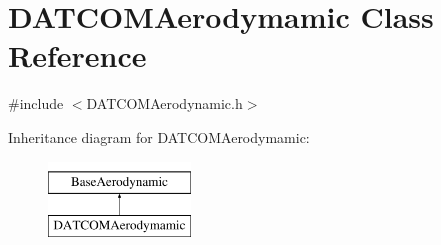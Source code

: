\hypertarget{class_d_a_t_c_o_m_aerodymamic}{}\section{D\+A\+T\+C\+O\+M\+Aerodymamic Class Reference}
\label{class_d_a_t_c_o_m_aerodymamic}


{\ttfamily \#include $<$D\+A\+T\+C\+O\+M\+Aerodynamic.\+h$>$}

Inheritance diagram for D\+A\+T\+C\+O\+M\+Aerodymamic\+:\begin{figure}[H]
\begin{center}
\leavevmode
\includegraphics[height=2.000000cm]{class_d_a_t_c_o_m_aerodymamic}
\end{center}
\end{figure}
